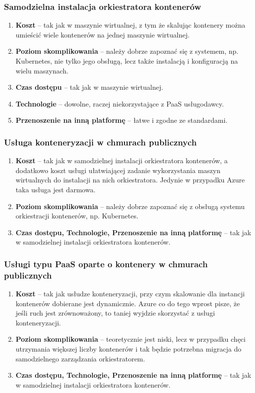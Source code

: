 \documentclass[12pt,a4paper,twoside,titlepage,openright]{book}
\begin{document}
\subsubsection{Samodzielna instalacja orkiestratora kontenerów}

\begin{enumerate}
	\item \textbf{Koszt} -- tak jak w maszynie wirtualnej, z tym że skalując kontenery można umieścić wiele kontenerów na jednej maszynie wirtualnej.
	\item \textbf{Poziom skomplikowania} -- należy dobrze zapoznać się z systemem, np. Kubernetes, nie tylko jego obsługą, lecz także instalacją i konfiguracją na wielu maszynach.
	\item \textbf{Czas dostępu} -- tak jak w maszynie wirtualnej.
	\item \textbf{Technologie} -- dowolne, raczej niekorzystające z PaaS usługodawcy.
	\item \textbf{Przenoszenie na inną platformę} -- łatwe i zgodne ze standardami.
\end{enumerate}

\subsubsection{Usługa konteneryzacji w chmurach publicznych}

\begin{enumerate}
	\item \textbf{Koszt} -- tak jak w samodzielnej instalacji orkiestratora kontenerów, a dodatkowo koszt usługi ułatwiającej zadanie wykorzystania maszyn wirtualnych do instalacji na nich orkiestratora. Jedynie w przypadku Azure taka usługa jest darmowa.
	\item \textbf{Poziom skomplikowania} -- należy dobrze zapoznać się z obsługą systemu orkiestracji kontenerów, np. Kubernetes.
	\item \textbf{Czas dostępu, Technologie, Przenoszenie na inną platformę} -- tak jak w samodzielnej instalacji orkiestratora kontenerów.
\end{enumerate}


\subsubsection{Usługi typu PaaS oparte o kontenery w chmurach publicznych}

\begin{enumerate}
	\item \textbf{Koszt} -- tak jak usłudze konteneryzacji, przy czym skalowanie dla instancji kontenerów dobierane jest dynamicznie. Azure co do tego wprost pisze, że jeśli ruch jest zrównoważony, to taniej wyjdzie skorzystać z usługi konteneryzacji.
	\item \textbf{Poziom skomplikowania} -- teoretycznie jest niski, lecz w przypadku chęci utrzymania większej liczby kontenerów i tak będzie potrzebna migracja do samodzielnego zarządzania orkiestratorem.
	\item \textbf{Czas dostępu, Technologie, Przenoszenie na inną platformę} -- tak jak w samodzielnej instalacji orkiestratora kontenerów.
\end{enumerate}
\end{document}
